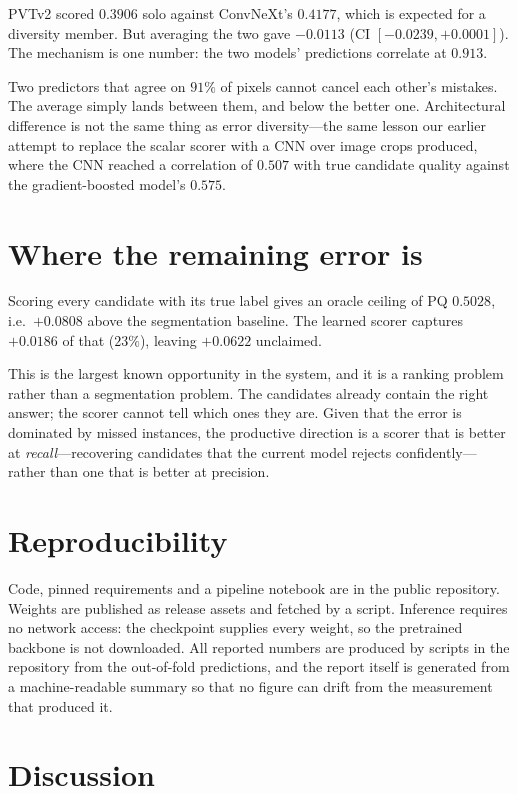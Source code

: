 \documentclass[conference]{IEEEtran}
\begin{document}
PVTv2 scored $0.3906$ solo against ConvNeXt's $0.4177$, which is expected for a
diversity member. But averaging the two gave $-0.0113$ (CI $[-0.0239, +0.0001]$).
The mechanism is one number: the two models' predictions correlate at
$\mathbf{0.913}$.

Two predictors that agree on $91\%$ of pixels cannot cancel each other's
mistakes. The average simply lands between them, and below the better one.
Architectural difference is not the same thing as error diversity---the same
lesson our earlier attempt to replace the scalar scorer with a CNN over image
crops produced, where the CNN reached a correlation of $0.507$ with true
candidate quality against the gradient-boosted model's $0.575$.

\section{Where the remaining error is}

Scoring every candidate with its true label gives an oracle ceiling of PQ
$0.5028$, i.e.\ $+0.0808$ above the segmentation baseline. The learned scorer
captures $+0.0186$ of that ($23\%$), leaving $+0.0622$ unclaimed.

This is the largest known opportunity in the system, and it is a ranking problem
rather than a segmentation problem. The candidates already contain the right
answer; the scorer cannot tell which ones they are. Given that the error is
dominated by missed instances, the productive direction is a scorer that is
better at \emph{recall}---recovering candidates that the current model rejects
confidently---rather than one that is better at precision.

\section{Reproducibility}

Code, pinned requirements and a pipeline notebook are in the public repository.
Weights are published as release assets and fetched by a script. Inference
requires no network access: the checkpoint supplies every weight, so the
pretrained backbone is not downloaded. All reported numbers are produced by
scripts in the repository from the out-of-fold predictions, and the report
itself is generated from a machine-readable summary so that no figure can drift
from the measurement that produced it.

\section{Discussion}
\end{document}
